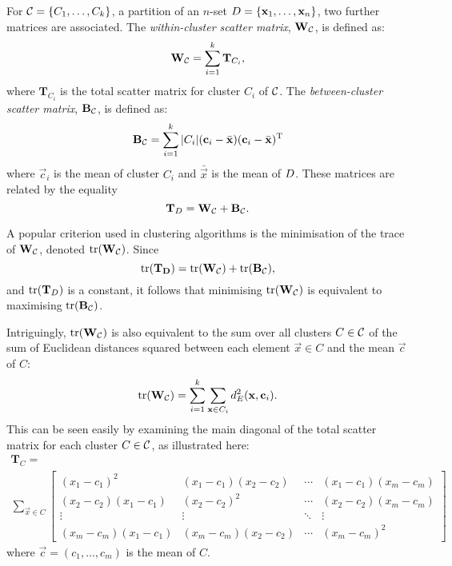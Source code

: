 For $\mathcal{C} = \{C_1,\dotsc,C_k\}$, a partition of an $n$-set $D =
\{\mathbf{x}_1,\dotsc,\mathbf{x}_n\}$, two further matrices are associated.  The
\textit{within-cluster scatter matrix}, $\mathbf{W}_{\mathcal{C}}$, is defined as:
\begin{equation*}
\mathbf{W}_{\mathcal{C}} = \sum_{i=1}^{k} \mathbf{T}_{C_i},
\end{equation*}
where $\mathbf{T}_{C_i}$ is the total scatter matrix for cluster $C_i$ of
$\mathcal{C}$.  The \textit{between-cluster scatter matrix}, $\mathbf{B}_{\mathcal{C}}$,
is defined as:
\begin{equation*}
  \mathbf{B}_{\mathcal{C}} =
  \sum_{i=1}^{k} |C_i| (\mathbf{c}_i - \bar{\mathbf{x}}) (\mathbf{c}_i -
  \bar{\mathbf{x}})^{\mathrm{T}}
\end{equation*}
where $\vec{c}_i$ is the mean of cluster $C_i$ and $\bar{\vec{x}}$ is the mean
of $D$.  These matrices are related by the equality
\begin{equation*}
  \mathbf{T}_{D} = \mathbf{W}_{\mathcal{C}} + \mathbf{B}_{\mathcal{C}}.
\end{equation*}

A popular criterion used in clustering algorithms is the minimisation of the
trace of $\mathbf{W_{\mathcal{C}}}$, denoted $\operatorname*{tr}(\mathbf{W_{\mathcal{C}}})$.  Since
\begin{equation*}
  \operatorname*{tr}(\mathbf{T_{D}}) = \operatorname*{tr}(\mathbf{W_{\mathcal{C}}}) + \operatorname*{tr}(\mathbf{B_{\mathcal{C}}}),
\end{equation*}
and $\operatorname*{tr}(\mathbf{T}_{D})$ is a constant, it follows that minimising
$\operatorname*{tr}(\mathbf{W_{\mathcal{C}}})$ is equivalent to maximising
$\operatorname*{tr}(\mathbf{B_{\mathcal{C}}})$.

Intriguingly, $\operatorname*{tr}(\mathbf{W}_{\mathcal{C}})$ is also equivalent to the sum over all
clusters $C \in \mathcal{C}$ of the sum of Euclidean distances squared between each
element $\vec{x} \in C$ and the mean $\vec{c}$ of $C$:
\begin{equation}
  \label{eq:tr(W)}
  \operatorname*{tr}(\mathbf{W_{\mathcal{C}}}) = \sum_{i=1}^{k} \sum_{\mathbf{x} \in C_i}
  d_{E}^2(\mathbf{x},\mathbf{c}_i).
\end{equation}
This can be seen easily by examining the main diagonal of the total scatter
matrix for each cluster $C \in \mathcal{C}$, as illustrated here:
\begin{multline*}
  \mathbf{T}_{C} = \\
  \sum_{\vec{x} \in C}
  \begin{bmatrix}
    (x_1-c_{1})^2 & (x_1-c_{1})(x_2-c_{2}) & \cdots &
    (x_1-c_{1})(x_m-c_{m}) \\
    (x_2-c_{2})(x_1-c_{1}) & (x_2-c_{2})^2 & \cdots &
    (x_2-c_{2})(x_m-c_{m}) \\
    \vdots & \vdots & \ddots & \vdots \\
    (x_m-c_{m})(x_1-c_{1}) & (x_m-c_{m})(x_2-c_{2}) & \cdots &
    (x_m-c_{m})^2
  \end{bmatrix}
\end{multline*}
where $\vec{c}=(c_1,\dotsc,c_m)$ is the mean of $C$.

